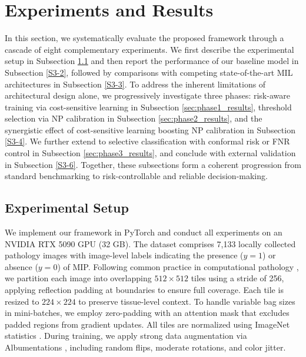 \documentclass[journal,twoside,web]{ieeecolor}
\begin{document}
\section{Experiments and Results}\label{sec:experiments}

In this section, we systematically evaluate the proposed framework through a cascade of eight complementary experiments. We first describe the experimental setup in Subsection \ref{S3-1} and then report the performance of our baseline model in Subsection \ref{S3-2}, followed by comparisons with competing state-of-the-art MIL architectures in Subsection \ref{S3-3}. To address the inherent limitations of architectural design alone, we progressively investigate three phases: risk-aware training via cost-sensitive learning in Subsection \ref{sec:phase1_results}, threshold selection via NP calibration in Subsection \ref{sec:phase2_results}, and the synergistic effect of cost-sensitive learning boosting NP calibration in Subsection \ref{S3-4}. We further extend to selective classification with conformal risk or FNR control in Subsection \ref{sec:phase3_results}, and conclude with external validation in Subsection \ref{S3-6}. Together, these subsections form a coherent progression from standard benchmarking to risk-controllable and reliable decision-making.

\subsection{Experimental Setup}\label{S3-1}

We implement our framework in PyTorch and conduct all experiments on an NVIDIA RTX 5090 GPU (32 GB). The dataset comprises 7,133 locally collected pathology images with image-level labels indicating the presence ($y=1$) or absence ($y=0$) of MIP. Following common practice in computational pathology \cite{campanella2019clinical,lu2021data}, we partition each image into overlapping $512 \times 512$ tiles using a stride of 256, applying reflection padding at boundaries to ensure full coverage. Each tile is resized to $224 \times 224$ to preserve tissue-level context. To handle variable bag sizes in mini-batches, we employ zero-padding with an attention mask that excludes padded regions from gradient updates. All tiles are normalized using ImageNet statistics \cite{russakovsky2015imagenet}. During training, we apply strong data augmentation via Albumentations \cite{buslaev2020albumentations}, including random flips, moderate rotations, and color jitter.
\end{document}
